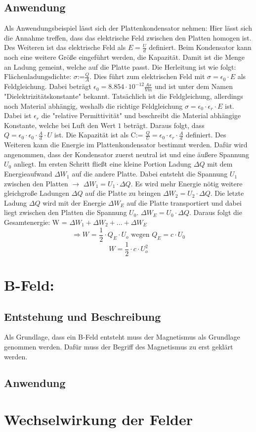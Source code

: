 \subsection{Anwendung}
Als Anwendungsbeispiel lässt sich der Plattenkondensator nehmen:
Hier lässt sich die Annahme treffen, dass das elektrische Feld zwischen den Platten homogen ist.
Des Weiteren ist das elektrische Feld als $E = \frac{U}{d}$ definiert.
Beim Kondensator kann noch eine weitere Größe eingeführt werden, die Kapazität.
Damit ist die Menge an Ladung gemeint, welche auf die Platte passt.
Die Herleitung ist wie folgt:
$\mbox{Flächenladungsdichte: } \sigma \mbox{:=} \frac{Q}{A}$.
Dies führt zum elektrischen Feld mit $\sigma = \epsilon_0 \cdot E$ als Feldgleichung.
Dabei beträgt $\epsilon_0 = 8.854 \cdot 10^{-12} \frac{As}{Vm}$ und ist unter dem Namen "Dielektrizitätskonstante" bekannt.
Tatsächlich ist die Feldgleichung, allerdings noch Material abhängig, weshalb die richtige Feldgleichung $\sigma = \epsilon_0 \cdot \epsilon_r \cdot E$ ist.
Dabei ist $\epsilon_r$ die "relative Permittivität" und beschreibt die Material abhängige Konstante, welche bei Luft den Wert $1$ beträgt.
Daraus folgt, dass $ Q = \epsilon_0 \cdot \epsilon_0 \cdot \frac{A}{d} \cdot U$ ist.
Die Kapazität ist als $\mbox{C:= } \frac{Q}{U} = \epsilon_0 \cdot \epsilon_r \cdot \frac{A}{d}$ definiert.
Des Weiteren kann die Energie im Plattenkondensator bestimmt werden.
Dafür wird angenommen, dass der Kondensator zuerst neutral ist und eine äußere Spannung $U_0$ anliegt.
Im ersten Schritt fließt eine kleine Portion Ladung $\Delta Q$ mit dem Energieaufwand $\Delta W_1$ auf die andere Platte. Dabei entsteht die Spannung $U_1$ zwischen den Platten $\rightarrow$ $\Delta W_1 = U_1 \cdot \Delta Q$.
Es wird mehr Energie nötig weitere gleichgroße Ladungen $\Delta Q$ auf die Platte zu bringen $\Delta W_2 = U_2 \cdot \Delta Q$.
Die letzte Ladung $\Delta Q$ wird mit der Energie $\Delta W_E$ auf die Platte transportiert und dabei liegt zwischen den Platten die Spannung $U_0$. 
$\Delta W_E = U_0 \cdot \Delta Q$.
Daraus folgt die Gesamtenergie: W = $\Delta W_1 + \Delta W_2 +...+ \Delta W_E$
$$\Rightarrow W \mbox{ = } \frac{1}{2}\cdot Q_E \cdot U_o \mbox{ wegen $Q_E = c \cdot U_0$}$$
$$W= \frac{1}{2} \cdot c \cdot U_o^2$$
\section{B-Feld:}
\subsection{Entstehung und Beschreibung}
Als Grundlage, dass ein B-Feld entsteht muss der Magnetismus als Grundlage genommen werden.
Dafür muss der Begriff des Magnetismus zu erst geklärt werden.

\subsection{Anwendung}
\section{Wechselwirkung der Felder}%